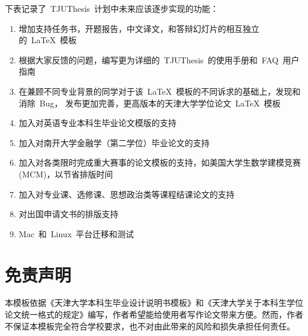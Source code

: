 下表记录了~TJUThesis~计划中未来应该逐步实现的功能：
\begin{enumerate}
  \item 增加支持任务书，开题报告，中文译文，和答辩幻灯片的相互独立的~\LaTeX~模板
  \item 根据大家反馈的问题，编写更为详细的~TJUThesis~的使用手册和~FAQ~用户指南
  \item 在兼顾不同专业背景的同学对于该~LaTeX~模板的不同诉求的基础上，发现和消除~Bug， 发布更加完善，更高版本的天津大学学位论文~LaTeX~模板
  \item 加入对英语专业本科生毕业论文模版的支持
  \item 加入对南开大学金融学（第二学位）毕业论文的支持
  \item 加入对各类限时完成重大赛事的论文模板的支持，如美国大学生数学建模竞赛(MCM)，以节省排版时间
  \item 加入对专业课、选修课、思想政治类等课程结课论文的支持
  \item 对出国申请文书的排版支持
  \item Mac~和~Linux~平台迁移和测试
\end{enumerate}

\section{免责声明}

本模板依据《天津大学本科生毕业设计说明书模板》和《天津大学关于本科生学位论文统一格式的规定》编写，作者希望能给使用者写作论文带来方便。然而，作者不保证本模板完全符合学校要求，也不对由此带来的风险和损失承担任何责任。
